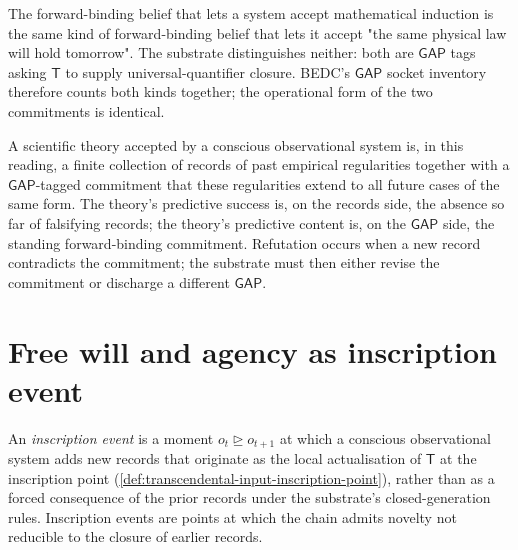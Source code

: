 \begin{remark}
\label{rem:hard-problems-causality-induction-share-socket}
The forward-binding belief that lets a system accept mathematical induction is the same kind of forward-binding belief that lets it accept "the same physical law will hold tomorrow". The substrate distinguishes neither: both are $\mathsf{GAP}$ tags asking $\mathsf{T}$ to supply universal-quantifier closure. BEDC's $\mathsf{GAP}$ socket inventory therefore counts both kinds together; the operational form of the two commitments is identical.
\end{remark}

\begin{example}
\label{ex:hard-problems-scientific-theory-stack}
A scientific theory accepted by a conscious observational system is, in this reading, a finite collection of records of past empirical regularities together with a $\mathsf{GAP}$-tagged commitment that these regularities extend to all future cases of the same form. The theory's predictive success is, on the records side, the absence so far of falsifying records; the theory's predictive content is, on the $\mathsf{GAP}$ side, the standing forward-binding commitment. Refutation occurs when a new record contradicts the commitment; the substrate must then either revise the commitment or discharge a different $\mathsf{GAP}$.
\end{example}

\section{Free will and agency as inscription event}
\label{sec:hard-problems-free-will}

\begin{definition}
\label{def:hard-problems-inscription-event}
An \emph{inscription event} is a moment $o_t \trianglerighteq o_{t+1}$ at which a conscious observational system adds new records that originate as the local actualisation of $\mathsf{T}$ at the inscription point (\autoref{def:transcendental-input-inscription-point}), rather than as a forced consequence of the prior records under the substrate's closed-generation rules. Inscription events are points at which the chain admits novelty not reducible to the closure of earlier records.
\end{definition}

